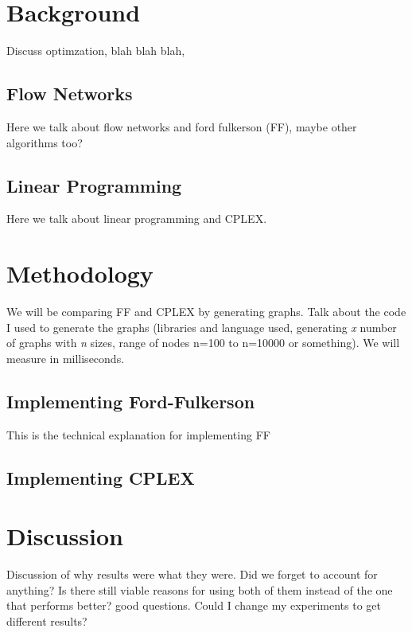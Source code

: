 \documentclass[11pt]{article}
\begin{document}
\section{Background}
\label{sec:org1c9d5dd}

Discuss optimzation, blah blah blah, 

\subsection{Flow Networks}
\label{sec:org55a8b53}

Here we talk about flow networks and ford fulkerson (FF), maybe other algorithms too?

\subsection{Linear Programming}
\label{sec:org6f85401}

Here we talk about linear programming and CPLEX. 

\section{Methodology}
\label{sec:org45a78a0}

We will be comparing FF and CPLEX by generating graphs. Talk about the code I used to generate the graphs (libraries and language used, generating \emph{x} number of graphs with \emph{n} sizes, range of nodes n=100 to n=10000 or something). We will measure in milliseconds.

\subsection{Implementing Ford-Fulkerson}
\label{sec:org9516e9e}

This is the technical explanation for implementing FF

\subsection{Implementing CPLEX}
\label{sec:org9650336}
\section{Discussion}
\label{sec:org01a098b}

Discussion of why results were what they were. Did we forget to account for anything? Is there still viable reasons for using both of them instead of the one that performs better? good questions. Could I change my experiments to get different results?
\end{document}
